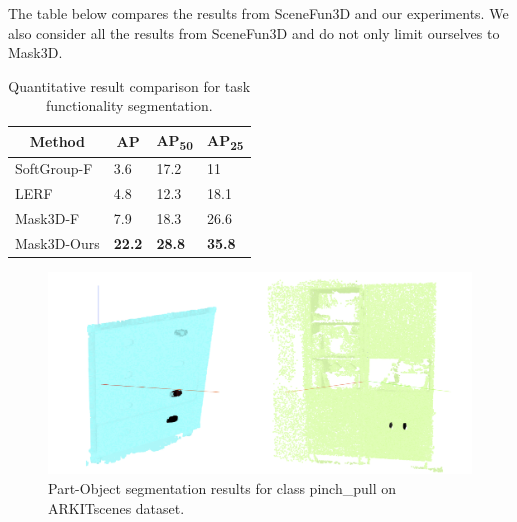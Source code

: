 The table below compares the results from SceneFun3D and our experiments. We also consider all the results from SceneFun3D and do not only limit ourselves to
Mask3D. 

\begin{longtable}{l|l|l|l}
    \caption{Quantitative result comparison for task functionality segmentation.} \label{tab:quantitativeResults} \\
    \hline \multicolumn{1}{|c|}{\textbf{Method}} & \multicolumn{1}{c|}{\textbf{AP}} & \multicolumn{1}{c|}{\textbf{AP\textsubscript{50}}} & \multicolumn{1}{c|}{\textbf{AP\textsubscript{25}}} \\ \hline
    SoftGroup-F & 3.6 & 17.2 & 11 \\
    LERF & 4.8 & 12.3 & 18.1\\
    Mask3D-F & 7.9 & 18.3 & 26.6\\
    Mask3D-Ours & \textbf{22.2} & \textbf{28.8} & \textbf{35.8}\\
    \hline
\end{longtable}
    
\begin{figure}[ht!]
    \centering
    \includegraphics[width=\textwidth]{content/images/results/PartObj.png}
    \caption{Part-Object segmentation results for class pinch\_pull on ARKITscenes dataset.}
    \label{fig:task1result1}
\end{figure}

